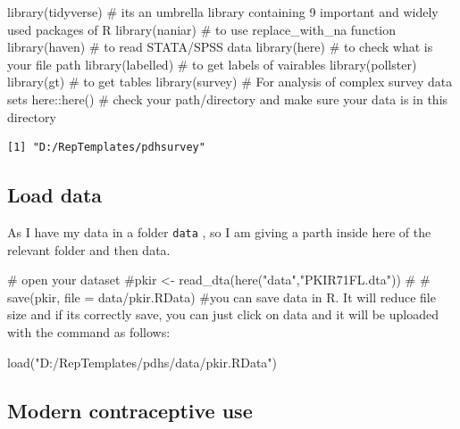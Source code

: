 \documentclass[
  letterpaper,
  DIV=11,
  numbers=noendperiod]{scrartcl}
\newenvironment{Shaded}{\begin{snugshade}}{\end{snugshade}}
\newcommand{\CommentTok}[1]{\textcolor[rgb]{0.37,0.37,0.37}{#1}}
\newcommand{\FunctionTok}[1]{\textcolor[rgb]{0.28,0.35,0.67}{#1}}
\newcommand{\NormalTok}[1]{\textcolor[rgb]{0.00,0.23,0.31}{#1}}
\newcommand{\SpecialCharTok}[1]{\textcolor[rgb]{0.37,0.37,0.37}{#1}}
\newcommand{\StringTok}[1]{\textcolor[rgb]{0.13,0.47,0.30}{#1}}
\begin{document}
\begin{Shaded}
\begin{Highlighting}[]
\FunctionTok{library}\NormalTok{(tidyverse) }\CommentTok{\# its an umbrella library containing 9 important and widely used packages of R}
\FunctionTok{library}\NormalTok{(naniar)   }\CommentTok{\# to use replace\_with\_na function}
\FunctionTok{library}\NormalTok{(haven)  }\CommentTok{\# to read STATA/SPSS data}
\FunctionTok{library}\NormalTok{(here)    }\CommentTok{\# to check what is your file path}
\FunctionTok{library}\NormalTok{(labelled) }\CommentTok{\# to get labels of vairables}
\FunctionTok{library}\NormalTok{(pollster)}
\FunctionTok{library}\NormalTok{(gt)  }\CommentTok{\# to get tables}
\FunctionTok{library}\NormalTok{(survey)  }\CommentTok{\# For analysis of complex survey data sets}
\NormalTok{here}\SpecialCharTok{::}\FunctionTok{here}\NormalTok{() }\CommentTok{\# check your path/directory and make sure your data is in this directory}
\end{Highlighting}
\end{Shaded}

\begin{verbatim}
[1] "D:/RepTemplates/pdhsurvey"
\end{verbatim}

\hypertarget{load-data}{%
\subsection{Load data}\label{load-data}}

As I have my data in a folder \texttt{data} , so I am giving a parth
inside here of the relevant folder and then data.

\begin{Shaded}
\begin{Highlighting}[]
\CommentTok{\# open your dataset}
\CommentTok{\#pkir \textless{}{-}  read\_dta(here("data","PKIR71FL.dta"))}
\CommentTok{\# }
\CommentTok{\# save(pkir, file = \textquotesingle{}data/pkir.RData\textquotesingle{}) \#you can save data in R. It will reduce file size and if its correctly save, you can just click on data and it will be uploaded with the command as follows:}

\FunctionTok{load}\NormalTok{(}\StringTok{"D:/RepTemplates/pdhs/data/pkir.RData"}\NormalTok{)}
\end{Highlighting}
\end{Shaded}

\hypertarget{modern-contraceptive-use}{%
\subsection{Modern contraceptive use}\label{modern-contraceptive-use}}
\end{document}
